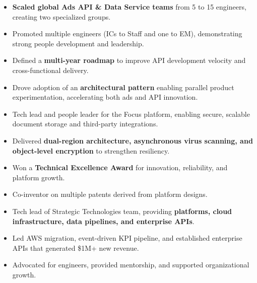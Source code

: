 \documentclass[10pt,a4paper,ragged2e,withhyper]{altacv}
\begin{document}
\begin{paracol}{2}

\divider{}


\begin{itemize}
    \item \textbf{Scaled global Ads API & Data Service teams} from 5 to 15 engineers, creating two specialized groups.
    \item Promoted multiple engineers (ICs to Staff and one to EM), demonstrating strong people development and leadership.
    \item Defined a \textbf{multi-year roadmap} to improve API development velocity and cross-functional delivery.
    \item Drove adoption of an \textbf{architectural pattern} enabling parallel product experimentation, accelerating both ads and API innovation.
\end{itemize}


\divider{}

\begin{itemize}
    \item Tech lead and people leader for the Focus platform, enabling secure, scalable document storage and third-party integrations.
    \item Delivered \textbf{dual-region architecture, asynchronous virus scanning, and object-level encryption} to strengthen resiliency.
    \item Won a \textbf{Technical Excellence Award} for innovation, reliability, and platform growth.
    \item Co-inventor on multiple patents derived from platform designs.
\end{itemize}


\divider{}

\begin{itemize}
    \item Tech lead of Strategic Technologies team, providing \textbf{platforms, cloud infrastructure, data pipelines, and enterprise APIs}.
    \item Led AWS migration, event-driven KPI pipeline, and established enterprise APIs that generated \$1M+ new revenue.
    \item Advocated for engineers, provided mentorship, and supported organizational growth.
\end{itemize}


\end{paracol}
\end{document}
